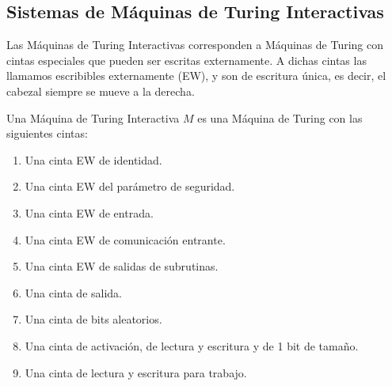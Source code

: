 \subsection{Sistemas de Máquinas de Turing Interactivas}

Las Máquinas de Turing Interactivas corresponden a Máquinas de Turing con cintas especiales que pueden ser
escritas externamente. A dichas cintas las llamamos escribibles externamente (EW), y son de escritura única,
es decir, el cabezal siempre se mueve a la derecha.

\begin{definicion}
Una Máquina de Turing Interactiva $M$ es una Máquina de Turing con las siguientes cintas:
\begin{enumerate}
    \item Una cinta EW de identidad.
    \item Una cinta EW del parámetro de seguridad.
    \item Una cinta EW de entrada.
    \item Una cinta EW de comunicación entrante.
    \item Una cinta EW de salidas de subrutinas.
    \item Una cinta de salida.
    \item Una cinta de bits aleatorios.
    \item Una cinta de activación, de lectura y escritura y de 1 bit de tamaño.
    \item Una cinta de lectura y escritura para trabajo. 
\end{enumerate}
\end{definicion}

